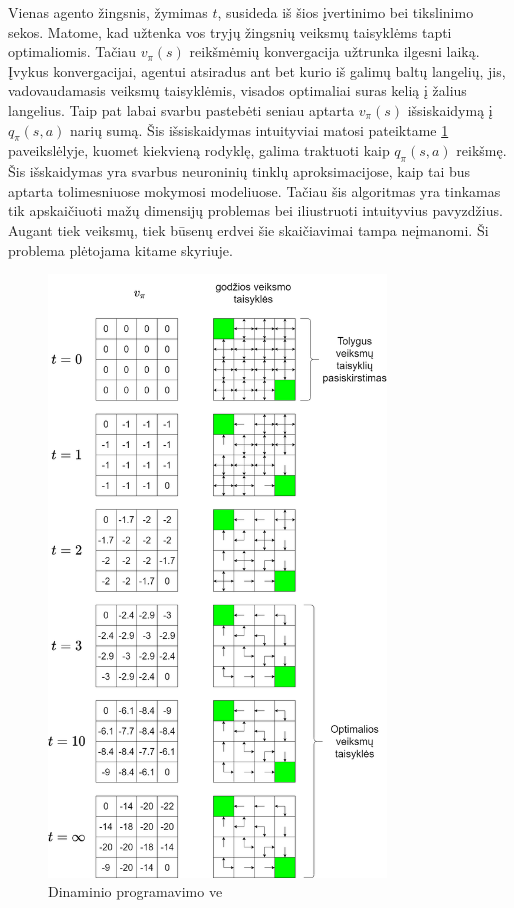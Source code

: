 \documentclass[a4paper, 12pt]{article}
\begin{document}
Vienas agento žingsnis, žymimas $t$, susideda iš šios įvertinimo bei tikslinimo sekos. Matome, kad užtenka vos tryjų žingsnių veiksmų taisyklėms tapti optimaliomis. Tačiau $v_{\pi}(s)$ reikšmėmių konvergacija užtrunka ilgesni laiką. Įvykus konvergacijai, agentui atsiradus ant bet kurio iš galimų baltų langelių, jis, vadovaudamasis veiksmų taisyklėmis, visados optimaliai suras kelią į žalius langelius. Taip pat labai svarbu pastebėti seniau aptarta $v_{\pi}(s)$ išsiskaidymą į $q_{\pi}(s, a)$ narių sumą. Šis išsiskaidymas intuityviai matosi pateiktame \ref{DynamicProgrammingExample} paveikslėlyje, kuomet kiekvieną rodyklę, galima traktuoti kaip $q_{\pi}(s, a)$ reikšmę. Šis išskaidymas yra svarbus neuroninių tinklų aproksimacijose, kaip tai bus aptarta tolimesniuose mokymosi modeliuose. Tačiau šis algoritmas yra tinkamas tik apskaičiuoti mažų dimensijų problemas bei iliustruoti intuityvius pavyzdžius. Augant tiek veiksmų, tiek būsenų erdvei šie skaičiavimai tampa neįmanomi. Ši problema plėtojama kitame skyriuje.


\begin{figure}[ht!]
\centering
\includegraphics[width=0.8\textwidth]{DynamicProgrammingExample}
\caption{Dinaminio programavimo ve }
\label{DynamicProgrammingExample}
\end{figure}
\end{document}
